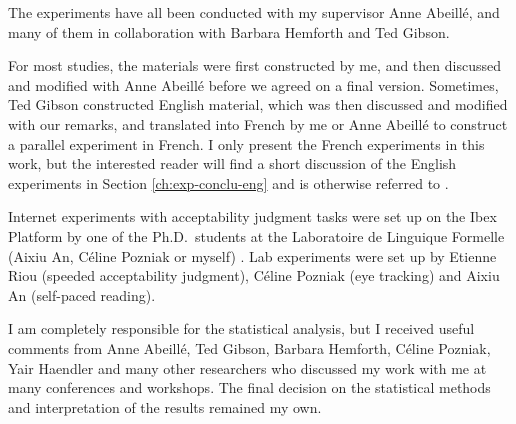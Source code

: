 The experiments have all been conducted with my supervisor Anne Abeillé, and many of them in collaboration with Barbara Hemforth and Ted Gibson. 

For most studies, the materials were first constructed by me, and then discussed and modified with Anne Abeillé before we agreed on a final version. Sometimes, Ted Gibson constructed English material, which was then discussed and modified with our remarks, and translated into French by me or Anne Abeillé to construct a parallel experiment in French. I only present the French experiments in this work, but the interested reader will find a short discussion of the English experiments in Section \ref{ch:exp-conclu-eng} and is otherwise referred to \citet{Abeille.2020.Cognition}.

Internet experiments with acceptability judgment tasks were set up on the Ibex Platform by one of the Ph.D.\ students at the Laboratoire de Linguique Formelle (Aixiu An, Céline Pozniak or myself)  \citep{Ibex}. Lab experiments were set up by Etienne Riou (speeded acceptability judgment), Céline Pozniak (eye tracking) and Aixiu An (self-paced reading).

I am completely responsible for the statistical analysis, but I received useful comments from Anne Abeillé, Ted Gibson, Barbara Hemforth, Céline Pozniak, Yair Haendler and many other researchers who discussed my work with me at many conferences and workshops. The final decision on the statistical methods and interpretation of the results remained my own.
